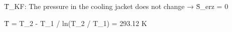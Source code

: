 T̄_KF: The pressure in the cooling jacket does not change → Ṡ_erz = 0  

T̄ = T_2 - T_1 / ln(T_2 / T_1)  
= 293.12 K